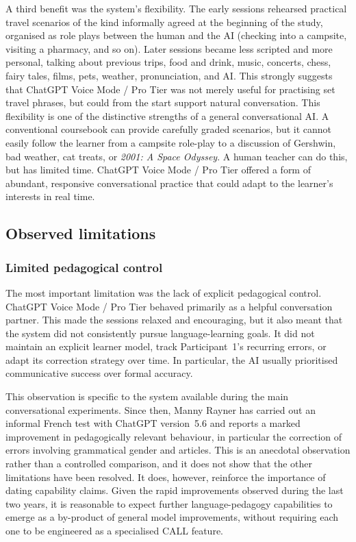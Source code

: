\documentclass[11pt,a4paper]{article}
\begin{document}
A third benefit was the system's flexibility. The early sessions rehearsed practical travel scenarios of the kind informally agreed at the beginning of the study, organised as role plays between the human and the AI (checking into a campsite, visiting a pharmacy, and so on). Later sessions became less scripted and more personal, talking about previous trips, food and drink, music, concerts, chess, fairy tales, films, pets, weather, pronunciation, and AI. This strongly suggests that ChatGPT Voice Mode / Pro Tier was not merely useful for practising set travel phrases, but could from the start support natural conversation. This flexibility is one of the distinctive strengths of a general conversational AI. A conventional coursebook can provide carefully graded scenarios, but it cannot easily follow the learner from a campsite role-play to a discussion of Gershwin, bad weather, cat treats, or \emph{2001: A Space Odyssey}. A human teacher can do this, but has limited time. ChatGPT Voice Mode / Pro Tier offered a form of abundant, responsive conversational practice that could adapt to the learner's interests in real time.

\subsection{Observed limitations}

\subsubsection*{Limited pedagogical control}

The most important limitation was the lack of explicit pedagogical control. ChatGPT Voice Mode / Pro Tier behaved primarily as a helpful conversation partner. This made the sessions relaxed and encouraging, but it also meant that the system did not consistently pursue language-learning goals. It did not maintain an explicit learner model, track Participant~1's recurring errors, or adapt its correction strategy over time. In particular, the AI usually prioritised communicative success over formal accuracy.

This observation is specific to the system available during the main conversational experiments. Since then, Manny Rayner has carried out an informal French test with ChatGPT version~5.6 and reports a marked improvement in pedagogically relevant behaviour, in particular the correction of errors involving grammatical gender and articles. This is an anecdotal observation rather than a controlled comparison, and it does not show that the other limitations have been resolved. It does, however, reinforce the importance of dating capability claims. Given the rapid improvements observed during the last two years, it is reasonable to expect further language-pedagogy capabilities to emerge as a by-product of general model improvements, without requiring each one to be engineered as a specialised CALL feature.
\end{document}
